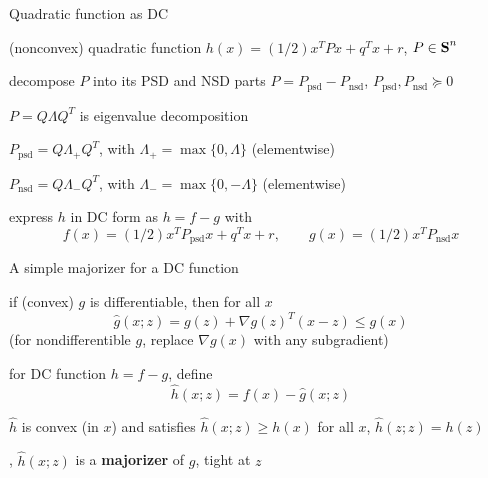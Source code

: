 \documentclass[aspectratio=169,11pt]{beamer}
\begin{document}
\begin{frame}{Quadratic function as DC}
\BIT
\item (nonconvex) quadratic function $h(x)= (1/2)x^TPx+q^Tx + r$, $P\in {\mbox{\bfseries\rmfamily S}}^n$
\item decompose $P$ into its PSD and NSD parts $P=P_\text{psd} - P_\text{nsd}$, 
$P_\text{psd},P_\text{nsd}\succeq 0$
\BIT
\item $P = Q\Lambda Q^T$ is eigenvalue decomposition
\item $P_\text{psd} = Q\Lambda_+ Q^T$, with 
$\Lambda_+ = \max\{0,\Lambda\}$ (elementwise)
\item $P_\text{nsd} = Q\Lambda_- Q^T$, with 
$\Lambda_- = \max\{0,-\Lambda\}$ (elementwise)
\EIT
\item express $h$ in DC form as $h=f-g$ with
\[
f(x)= (1/2)x^TP_\text{psd}x+q^Tx + r, \qquad g(x)=(1/2)x^TP_\text{nsd}x 
\]
\EIT
\end{frame}

\begin{frame}{A simple majorizer for a DC function}
\BIT
\item if (convex) $g$ is differentiable, then for all $x$
\[
\hat g(x;z) = g(z)+ \nabla g(z)^T (x-z) \leq g(x)
\]
(for nondifferentible $g$, replace $\nabla g(x)$ with any subgradient)
\item for DC function $h=f-g$, define
\[
\hat h(x;z)= f(x)-\hat g(x;z)
\]
\item $\hat h$ is convex (in $x$) and satisfies
$\hat h(x;z) \geq h(x)$ for all $x$,
$\hat h(z;z) = h(z)$
\item \ie,
$\hat h(x;z)$ is a \textbf{majorizer} of $g$, tight at $z$
\EIT
\end{frame}
\end{document}
